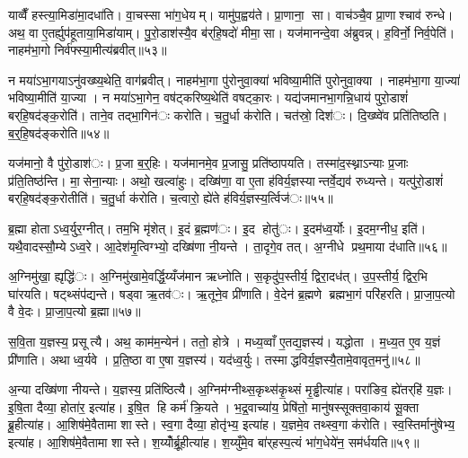 याव्वैँ हस्त्या॒मिडा॑मा॒दधा॑ति। वा॒चस्सा भा॑ग॒धेयम्। यामु॑प॒ह्वय॑ते। प्रा॒णाना॒ सा। वाच॑ञ्चै॒व प्रा॒णाश्चाव॑ रुन्धे। अथ॒ वा ए॒तर्ह्युप॑हूताया॒मिडा॑याम्। पु॒रो॒डाश॑स्यै॒व ब॑र्‌हि॒षदो॑ मीमा॒सा। यज॑मानन्दे॒वा अ॑ब्रुवन्न्। ह॒विर्नो॒ निर्व॒पेति॑। नाहम॑भा॒गो निर्व॑फ्स्या॒मीत्य॑ब्रवीत्॥५३॥

न मया॑ऽभा॒गयाऽनु॑वख्ष्य॒थेति॒ वाग॑ब्रवीत्। नाहम॑भा॒गा पु॑रोनुवा॒क्या॑ भविष्या॒मीति॑ पुरोनुवा॒क्या। नाहम॑भा॒गा या॒ज्या॑ भविष्या॒मीति॑ या॒ज्या। न मया॑ऽभा॒गेन॒ वष॑ट्करिष्य॒थेति॑ वषट्का॒रः। यद्य॑जमानभा॒गन्नि॒धाय॑ पुरो॒डाशं॑ बर्‌हि॒षद॑ङ्क॒रोति॑। ताने॒व तद्भा॒गिन॑ः करोति। च॒तु॒र्धा क॑रोति। चत॑स्रो॒ दिश॑ः। दि॒ख्ष्वे॑व प्रति॑तिष्ठति। ब॒र्॒हि॒षद॑ङ्करोति॥५४॥

यज॑मानो॒ वै पु॑रो॒डाश॑ः। प्र॒जा ब॒र्॒हिः। यज॑मानमे॒व प्र॒जासु॒ प्रति॑ष्ठापयति। तस्मा॑द॒स्थ्नाऽन्याः प्र॒जाः प्र॑ति॒तिष्ठ॑न्ति। मा॒सेना॒न्याः। अथो॒ खल्वा॑हुः। दख्षि॑णा॒ वा ए॒ता ह॑विर्य॒ज्ञस्यान्तर्वे॒द्यव॑ रुध्यन्ते। यत्पु॑रो॒डाशं॑ बर्‌हि॒षद॑ङ्क॒रोतीति॑। च॒तु॒र्धा क॑रोति। च॒त्वारो॒ ह्ये॑ते ह॑विर्य॒ज्ञस्य॒र्त्विज॑ः॥५५॥

ब्र॒ह्मा होताऽध्व॒र्युर॒ग्नीत्। तम॒भि मृ॑शेत्। इ॒दं ब्र॒ह्मण॑ः। इ॒द होतु॑ः। इ॒दम॑ध्व॒र्योः। इ॒दम॒ग्नीध॒ इति॑। यथै॒वादस्सौ॒म्येऽध्व॒रे। आ॒देश॑मृ॒त्विग्भ्यो॒ दख्षि॑णा नी॒यन्ते। ता॒दृगे॒व तत्। अ॒ग्नीधे प्रथ॒माया द॑धाति॥५६॥

अ॒ग्निमु॑खा॒ ह्यृद्धि॑ः। अ॒ग्निमु॑खामे॒वर्द्धि॒य्यँज॑मान ऋध्नोति। स॒कृदु॑प॒स्तीर्य॒ द्विरा॒दध॑त्। उ॒प॒स्तीर्य॒ द्विर॒भि घा॑रयति। षट्थ्संप॑द्यन्ते। षड्वा ऋ॒तव॑ः। ऋ॒तूने॒व प्री॑णाति। वे॒देन॑ ब्र॒ह्मणे ब्रह्मभा॒गं परि॑हरति। प्रा॒जा॒प॒त्यो वै वे॒दः। प्रा॒जा॒प॒त्यो ब्र॒ह्मा॥५७॥

स॒वि॒ता य॒ज्ञस्य॒ प्रसूत्यै। अथ॒ काम॑म॒न्येन॑। ततो॒ होत्रे। मध्य॒व्वाँ ए॒तद्य॒ज्ञस्य॑। यद्धोता। म॒ध्य॒त ए॒व य॒ज्ञं प्री॑णाति। अथाध्व॒र्यवे। प्र॒ति॒ष्ठा वा ए॒षा य॒ज्ञस्य॑। यद॑ध्व॒र्युः। तस्माद्धविर्य॒ज्ञस्यै॒तामे॒वावृत॒मनु॑॥५८॥

अ॒न्या दख्षि॑णा नीयन्ते। य॒ज्ञस्य॒ प्रति॑ष्ठित्यै। अ॒ग्निम॑ग्नीथ्स॒कृथ्स॑कृ॒थ्सं मृ॒ड्ढीत्या॑ह। परा॑ङिव॒ ह्ये॑तर्‌हि॑ य॒ज्ञः। इ॒षि॒ता दैव्या॒ होता॑र॒ इत्या॑ह। इ॒षि॒त हि कर्म॑ क्रि॒यते। भ॒द्र॒वाच्या॑य॒ प्रेषि॑तो॒ मानु॑षस्सूक्तवा॒काय॑ सू॒क्ता ब्रू॒हीत्या॑ह। आ॒शिष॑मे॒वैतामा शास्ते। स्व॒गा दैव्या॒ होतृ॑भ्य॒ इत्या॑ह। य॒ज्ञमे॒व तथ्स्व॒गा क॑रोति। स्व॒स्तिर्मानु॑षेभ्य॒ इत्या॑ह। आ॒शिष॑मे॒वैतामा शास्ते। श॒य्योँर्ब्रू॒हीत्या॑ह। श॒य्युँमे॒व बा॑र्‌हस्प॒त्यं भा॑ग॒धेये॑न॒ सम॑र्धयति॥५९॥


